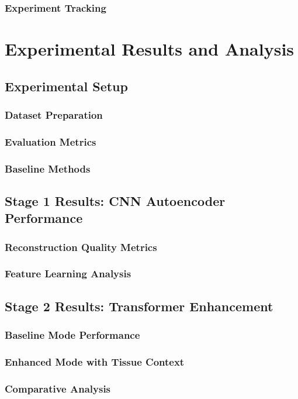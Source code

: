 \documentclass[12pt,a4paper]{report}
\begin{document}
\subsection{Experiment Tracking}

\chapter{Experimental Results and Analysis}
\section{Experimental Setup}
\subsection{Dataset Preparation}
\subsection{Evaluation Metrics}
\subsection{Baseline Methods}
\section{Stage 1 Results: CNN Autoencoder Performance}
\subsection{Reconstruction Quality Metrics}
\subsection{Feature Learning Analysis}
\section{Stage 2 Results: Transformer Enhancement}
\subsection{Baseline Mode Performance}
\subsection{Enhanced Mode with Tissue Context}
\subsection{Comparative Analysis}
\end{document}
